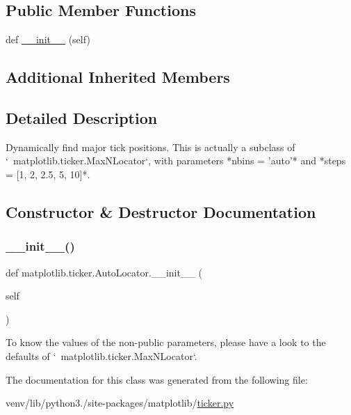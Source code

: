 \subsection*{Public Member Functions}
\begin{DoxyCompactItemize}
\item 
def \hyperlink{classmatplotlib_1_1ticker_1_1AutoLocator_ab8ff0130bc2e35a39b26b0e4a97690db}{\+\_\+\+\_\+init\+\_\+\+\_\+} (self)
\end{DoxyCompactItemize}
\subsection*{Additional Inherited Members}


\subsection{Detailed Description}
\begin{DoxyVerb}Dynamically find major tick positions. This is actually a subclass
of `~matplotlib.ticker.MaxNLocator`, with parameters *nbins = 'auto'*
and *steps = [1, 2, 2.5, 5, 10]*.
\end{DoxyVerb}
 

\subsection{Constructor \& Destructor Documentation}
\mbox{\label{classmatplotlib_1_1ticker_1_1AutoLocator_ab8ff0130bc2e35a39b26b0e4a97690db}} 
\subsubsection{\texorpdfstring{\+\_\+\+\_\+init\+\_\+\+\_\+()}{\_\_init\_\_()}}
{\footnotesize\ttfamily def matplotlib.\+ticker.\+Auto\+Locator.\+\_\+\+\_\+init\+\_\+\+\_\+ (\begin{DoxyParamCaption}\item[{}]{self }\end{DoxyParamCaption})}

\begin{DoxyVerb}To know the values of the non-public parameters, please have a
look to the defaults of `~matplotlib.ticker.MaxNLocator`.
\end{DoxyVerb}
 

The documentation for this class was generated from the following file\+:\begin{DoxyCompactItemize}
\item 
venv/lib/python3./site-\/packages/matplotlib/\hyperlink{ticker_8py}{ticker.\+py}\end{DoxyCompactItemize}
